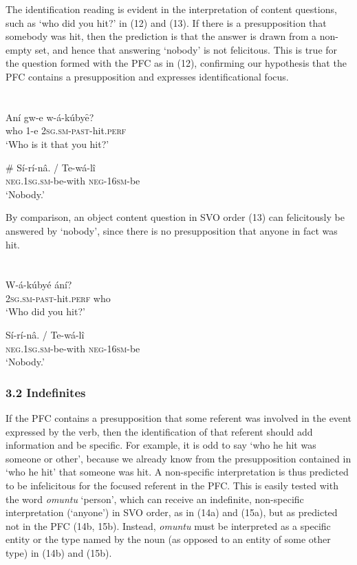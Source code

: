 \documentclass[output=paper]{langsci/langscibook}
\begin{document}
The identification reading is evident in the interpretation of content questions, such as ‘who did you hit?’ in (12) and (13). If there is a presupposition that somebody was hit, then the prediction is that the answer is drawn from a non-empty set, and hence that answering ‘nobody’ is not felicitous. This is true for the question formed with the PFC as in (12), confirming our hypothesis that the PFC contains a presupposition and expresses identificational focus. 

\chapter{}
\gll Aní  gw-e  w-á-kúbyȇ?\\
     who  1-e  \textsc{2sg.sm-past}{}-hit.\textsc{perf}\\
\glt ‘Who is it that you hit?’
\z

\gll \# Sí-rí-nâ.    /  Te-wá-lî\\
     \textsc{neg.1sg.sm}{}-be-with    \textsc{neg-16sm}{}-be\\
\glt ‘Nobody.’
\z

By comparison, an object content question in SVO order (13) can felicitously be answered by ‘nobody’, since there is no presupposition that anyone in fact was hit.

\chapter{}
\gll W-á-kúbyé    ání?\\
     \textsc{2sg.sm-past}{}-hit.\textsc{perf}  who\\
\glt ‘Who did you hit?’
\z

\gll Sí-rí-nâ.      /   Te-wá-lî\\
     \textsc{neg.1sg.sm}{}-be-with    \textsc{neg-16sm}{}-be\\
\glt ‘Nobody.’
\z

\subsection{ 3.2 Indefinites}

If the PFC contains a presupposition that some referent was involved in the event expressed by the verb, then the identification of that referent should add information and be specific. For example, it is odd to say ‘who he hit was someone or other’, because we already know from the presupposition contained in ‘who he hit’ that someone was hit. A non-specific interpretation is thus predicted to be infelicitous for the focused referent in the PFC. This is easily tested with the word \textit{omuntu} ‘person’, which can receive an indefinite, non-specific interpretation (‘anyone’) in SVO order, as in (14a) and (15a), but as predicted not in the PFC (14b, 15b). Instead, \textit{omuntu} must be interpreted as a specific entity or the type named by the noun (as opposed to an entity of some other type) in (14b) and (15b).
\end{document}
